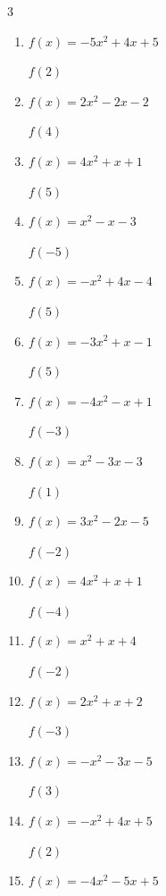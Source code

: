 \begin{multicols}{3}
\begin{enumerate}
  \item $f(x)=-5x^{2}+4x+5$

$f(2)$
        \phantom{$= -7$}

  \item $f(x)=2x^{2}-2x-2$

$f(4)$
        \phantom{$= 22$}

  \item $f(x)=4x^{2}+x+1$

$f(5)$
        \phantom{$= 106$}

  \item $f(x)=x^{2}-x-3$

$f(-5)$
        \phantom{$= 27$}

\columnbreak %

  \item $f(x)=-x^{2}+4x-4$

$f(5)$
        \phantom{$= -9$}

  \item $f(x)=-3x^{2}+x-1$

$f(5)$
        \phantom{$= -71$}

  \item $f(x)=-4x^{2}-x+1$

$f(-3)$
        \phantom{$= -32$}

  \item $f(x)=x^{2}-3x-3$

$f(1)$
        \phantom{$= -5$}

  \item $f(x)=3x^{2}-2x-5$

$f(-2)$
        \phantom{$= 11$}

  \item $f(x)=4x^{2}+x+1$

$f(-4)$
        \phantom{$= 61$}

  \item $f(x)=x^{2}+x+4$

$f(-2)$
        \phantom{$= 6$}

  \item $f(x)=2x^{2}+x+2$

$f(-3)$
        \phantom{$= 17$}

  \item $f(x)=-x^{2}-3x-5$

$f(3)$
        \phantom{$= -23$}

  \item $f(x)=-x^{2}+4x+5$

$f(2)$
        \phantom{$= 9$}

  \item $f(x)=-4x^{2}-5x+5$


\end{enumerate}
\end{multicols}
